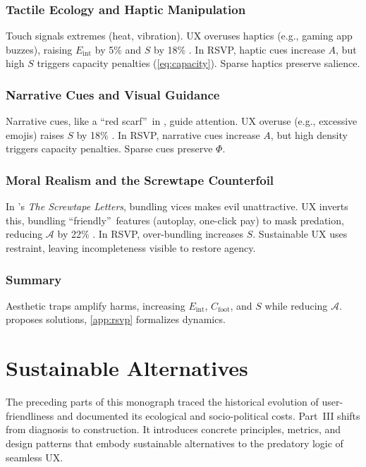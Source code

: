 \documentclass[openany]{book}
\newcommand{\PhiS}{\Phi} %
\newcommand{\Sent}{S} %
\newcommand{\Eint}{E_{\mathrm{int}}} %
\newcommand{\Cfoot}{C_{\mathrm{foot}}} %
\newcommand{\Auton}{\mathcal{A}} %
\begin{document}
\section{Tactile Ecology and Haptic Manipulation}
\label{sec:tactile-ecology}
Touch signals extremes (heat, vibration). UX overuses haptics (e.g., gaming app buzzes), raising \(\Eint\) by 5\% and \(\Sent\) by 18\% \citep{gallace2006}. In RSVP, haptic cues increase \(A\), but high \(\Sent\) triggers capacity penalties (\cref{eq:capacity}). Sparse haptics preserve salience.

\section{Narrative Cues and Visual Guidance}
\label{sec:narrative-cues}
Narrative cues, like a \textquotedblleft red scarf\textquotedblright\ in \citet{lewis1942}, guide attention. UX overuse (e.g., excessive emojis) raises \(\Sent\) by 18\% \citep{colak2024}. In RSVP, narrative cues increase \(A\), but high density triggers capacity penalties. Sparse cues preserve \(\PhiS\).

\section{Moral Realism and the Screwtape Counterfoil}
\label{sec:screwtape}
In \citet{lewis1942}’s \emph{The Screwtape Letters}, bundling vices makes evil unattractive. UX inverts this, bundling \textquotedblleft friendly\textquotedblright\ features (autoplay, one-click pay) to mask predation, reducing \(\Auton\) by 22\% \citep{doctorow2022}. In RSVP, over-bundling increases \(\Sent\). Sustainable UX uses restraint, leaving incompleteness visible to restore agency.

\section{Summary}
Aesthetic traps amplify harms, increasing \(\Eint\), \(\Cfoot\), and \(\Sent\) while reducing \(\Auton\).  proposes solutions, \cref{app:rsvp} formalizes dynamics.

\part{Sustainable Alternatives}
The preceding parts of this monograph traced the historical evolution of
user-friendliness and documented its ecological and socio-political costs.
Part~III shifts from diagnosis to construction. It introduces concrete
principles, metrics, and design patterns that embody sustainable alternatives
to the predatory logic of seamless UX.
\end{document}
